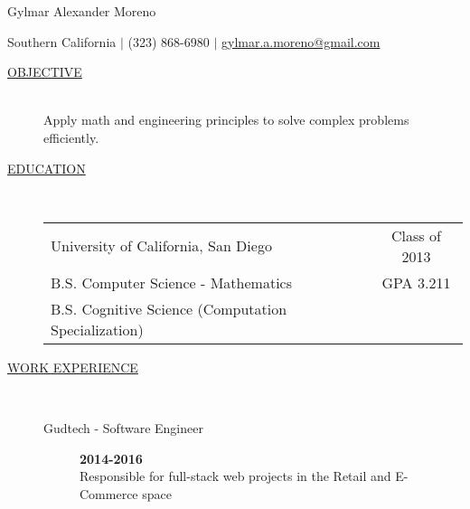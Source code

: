 \documentclass{article}
\begin{document}
\center
{
	\LARGE{Gylmar Alexander Moreno}
}


	Southern California $\mid$ (323) 868-6980 $\mid$
\href{mailto:gylmar.a.moreno@gmail.com}{gylmar.a.moreno@gmail.com}
\begin{description}
    \item[\underline{OBJECTIVE}] \hfill \\
        Apply math and engineering principles to solve complex problems efficiently.

    \item[\underline{EDUCATION}]  \hfill \\
        \begin{tabular}{l|c}
            \large{University of California, San Diego}& \hfill \large{Class of 2013}\\
                            B.S. Computer Science - Mathematics & \hfill \large{GPA 3.211}\\
			B.S. Cognitive Science (Computation Specialization)&\\
		\end{tabular}

    \item[\underline{WORK EXPERIENCE}] \hfill \\
		\begin{description}
            \item[Gudtech - Software Engineer] \hfill \textbf{2014-2016}\\

                Responsible for full-stack web projects in the Retail and E-Commerce space


\end{description}
\end{description}
\end{document}
